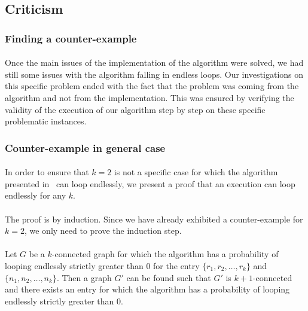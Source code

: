 \subsection{Criticism}
\subsubsection{Finding a counter-example}
\paragraph{}
Once the main issues of the implementation of the algorithm were solved, we
had still some issues with the algorithm falling in endless loops. Our
investigations on this specific problem ended with the fact that the problem was
coming from the algorithm and not from the implementation. This was ensured by
verifying the validity of the execution of our algorithm step by step on these
specific problematic instances.



\subsubsection{Counter-example in general case}
\paragraph{}
In order to ensure that $k=2$ is not a specific case for which the algorithm
presented in~\cite{JS94} can loop endlessly, we present a proof that an
execution can loop endlessly for any $k$.

\paragraph{}
The proof is by induction. Since we have already exhibited
a counter-example for $k=2$, we only need to prove the induction step.

\paragraph{}
Let $G$ be a $k$-connected graph for which the algorithm has a
probability of looping endlessly strictly greater than $0$ for the entry
$\{r_1,r_2, \dots, r_k\}$ and $\{n_1,n_2, \dots, n_k\}$. Then a graph $G'$ can
be found such that $G'$ is $k+1$-connected and there exists an entry for which
the algorithm has a probability of looping endlessly strictly greater than $0$.


